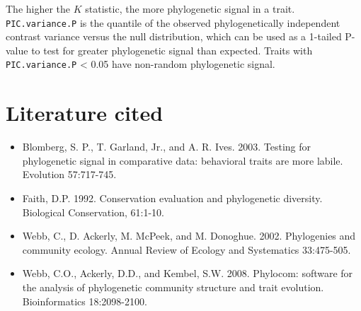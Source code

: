 \documentclass[12pt]{article}
\begin{document}
The higher the $K$ statistic, the more phylogenetic signal in a trait. \texttt{PIC.variance.P} is the quantile of the observed phylogenetically independent contrast variance versus the null distribution, which can be used as a 1-tailed P-value to test for greater phylogenetic signal than expected. Traits with \texttt{PIC.variance.P} < 0.05 have non-random phylogenetic signal.

\section{Literature cited}

\begin{itemize}
\item{Blomberg, S. P., T. Garland, Jr., and A. R. Ives. 2003. Testing for phylogenetic signal in comparative data: behavioral traits are more labile. Evolution 57:717-745.}
\item{Faith, D.P. 1992. Conservation evaluation and phylogenetic diversity. Biological Conservation, 61:1-10.}
\item{Webb, C., D. Ackerly, M. McPeek, and M. Donoghue. 2002. Phylogenies and community ecology. Annual Review of Ecology and Systematics 33:475-505.}
\item{Webb, C.O., Ackerly, D.D., and Kembel, S.W. 2008. Phylocom: software for the analysis of phylogenetic community structure and trait evolution. Bioinformatics 18:2098-2100. }
\end{itemize}
\end{document}
